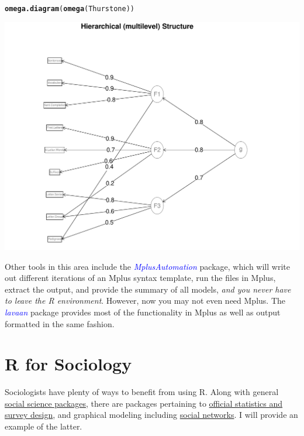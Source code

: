 \documentclass[english,nohyper,titlepage]{tufte-handout}\usepackage[]{graphicx}\usepackage[]{color}
\makeatletter
\newcommand{\hlstd}[1]{\textcolor[rgb]{0.345,0.345,0.345}{#1}}%
\newcommand{\hlkwd}[1]{\textcolor[rgb]{0.737,0.353,0.396}{\textbf{#1}}}%
\newenvironment{kframe}{%
 \def\at@end@of@kframe{}%
 \ifinner\ifhmode%
  \def\at@end@of@kframe{\end{minipage}}%
  \begin{minipage}{\columnwidth}%
 \fi\fi%
 \def\FrameCommand##1{\hskip\@totalleftmargin \hskip-\fboxsep
 \colorbox{shadecolor}{##1}\hskip-\fboxsep
     \hskip-\linewidth \hskip-\@totalleftmargin \hskip\columnwidth}%
 \MakeFramed {\advance\hsize-\width
   \@totalleftmargin\z@ \linewidth\hsize
   \@setminipage}}%
 {\par\unskip\endMakeFramed%
 \at@end@of@kframe}
\newenvironment{knitrout}{}{} %
\makeatother
\begin{document}
\begin{knitrout}\footnotesize
{}\color{fgcolor}\begin{kframe}
\begin{alltt}
\hlkwd{omega.diagram}\hlstd{(}\hlkwd{omega}\hlstd{(Thurstone))}
\end{alltt}
\end{kframe}
\end{knitrout}
\includegraphics[scale=.4]{FAHierarchical.pdf}

Other tools in this area include the \emph{\textcolor{blue}{MplusAutomation}} package, which will write out different iterations of an Mplus syntax template, run the files in Mplus, extract the output, and provide the summary of all models, \emph{and you never have to leave the R environment}.  However, now you may not even need Mplus. The \emph{\textcolor{blue}{lavaan}} package provides most of the functionality in Mplus as well as output formatted in the same fashion.






\part{R for Sociology}
Sociologists have plenty of ways to benefit from using R.  Along with general \href{http://cran.r-project.org/web/views/SocialSciences.html}{social science packages}, there are packages pertaining to \href{http://cran.r-project.org/web/views/OfficialStatistics.html}{official statistics and survey design}, and graphical modeling including \href{http://cran.r-project.org/web/views/gR.html}{social networks}.  I will provide an example of the latter.
\end{document}
